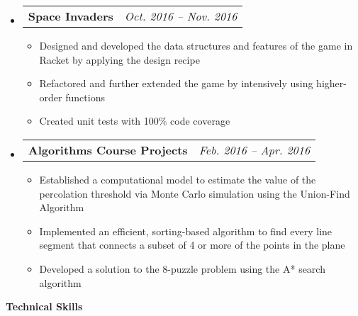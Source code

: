 \documentclass{article}
\makeatletter
\newcommand{\resitem}[1]{
    \item #1
    \vspace{-2pt}
}
\newcommand{\resheading}[1]{{\large \colorbox{mygrey}{\begin{minipage}{\textwidth}{\textbf{#1 \vphantom{p\^{E}}}}\end{minipage}}}}
\newcommand{\ressubheadingproj}[2]{
\begin{tabular*}{6.80in}{l@{\extracolsep{\fill}}r}
    \textbf{#1} & \textit{#2} \\
\end{tabular*}\vspace{-6pt}}
\makeatother
\begin{document}
    \begin{itemize}
        \item\ressubheadingproj
        {Space Invaders}
        {Oct. 2016 -- Nov. 2016}
        {\footnotesize
        \begin{itemize}
            \resitem
            {Designed and developed the data structures and features of the game in
            Racket by applying the design recipe}
            \resitem
            {Refactored and further extended the game by intensively using higher-order
            functions}
            \resitem
            {Created unit tests with 100\% code coverage}

        \end{itemize}
        }
    \end{itemize}

    \begin{itemize}
        \item\ressubheadingproj
        {Algorithms Course Projects}{Feb. 2016 -- Apr. 2016}
        {\footnotesize
        \begin{itemize}
            \resitem
            {Established a computational model to estimate the value of the percolation
            threshold via Monte Carlo simulation using the Union-Find Algorithm}
            \resitem
            {Implemented an efficient, sorting-based algorithm to find every line segment
            that connects a subset of 4 or more of the points in the plane}
            \resitem
            {Developed a solution to the 8-puzzle problem using the A* search algorithm}
        \end{itemize}
        }
    \end{itemize}


    \resheading{Technical Skills}
\end{document}
